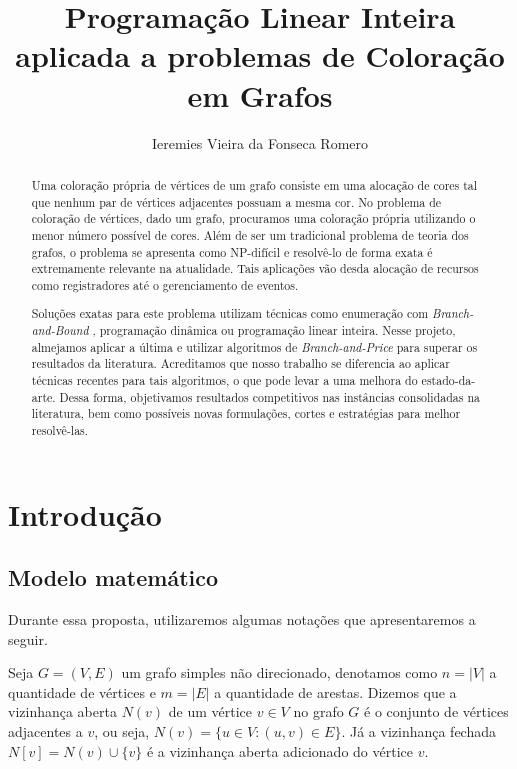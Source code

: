 \documentclass[11pt]{article}
\author{Ieremies Vieira da Fonseca Romero}
\date{}
\title{Programação Linear Inteira aplicada a problemas de Coloração em Grafos}
\begin{document}
\maketitle
\begin{abstract}
Uma coloração própria de vértices de um grafo consiste em uma alocação de cores tal que nenhum par de vértices adjacentes possuam a mesma cor.
No problema de coloração de vértices, dado um grafo, procuramos uma coloração própria utilizando o menor número possível de cores.
Além de ser um tradicional problema de teoria dos grafos, o problema se apresenta como NP-difícil e resolvê-lo de forma exata é extremamente relevante na atualidade.
Tais aplicações vão desda alocação de recursos como registradores até o gerenciamento de eventos.

Soluções exatas para este problema utilizam técnicas como enumeração com \emph{Branch-and-Bound} \autocite{Furini2016ImprovedDSATURBased}, programação dinâmica \autocites{Eppstein2006SmallMaximalIndependent}[][]{Byskov2002ChromaticNumberTime} ou programação linear inteira.
Nesse projeto, almejamos aplicar a última e utilizar algoritmos de \emph{Branch-and-Price} para superar os resultados da literatura.
Acreditamos que nosso trabalho se diferencia ao aplicar técnicas recentes para tais algoritmos, o que pode levar a uma melhora do estado-da-arte.
Dessa forma, objetivamos resultados competitivos nas instâncias consolidadas na literatura, bem como possíveis novas formulações, cortes e estratégias para melhor resolvê-las.
\end{abstract}

\section{Introdução}
\label{sec:org8ee3af0}

\subsection{Modelo matemático}
\label{sec:orgc0786b8}
Durante essa proposta, utilizaremos algumas notações que apresentaremos a seguir.

Seja \(G = (V,E)\) um grafo simples não direcionado, denotamos como \(n = |V|\) a quantidade de vértices e \(m = |E|\) a quantidade de arestas.
Dizemos que a vizinhança aberta \(N(v)\) de um vértice \(v \in V\) no grafo \(G\) é o conjunto de vértices adjacentes a \(v\), ou seja, \(N(v) = \{u \in V : (u,v) \in E\}\).
Já a vizinhança fechada \(N[v] = N(v) \cup \{v\}\) é a vizinhança aberta adicionado do vértice \(v\).
\end{document}
